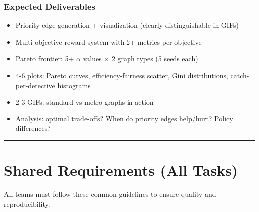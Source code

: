 \documentclass[11pt,a4paper]{scrartcl}
\newcommand{\sectiondivider}{%
  \vspace{0.2em}%
  \noindent\textcolor{rulecolor}{\rule{0.3\textwidth}{0.4pt}}%
  \vspace{0.3em}%
}
\begin{document}
\subsubsection*{Expected Deliverables}
\begin{itemize}[leftmargin=1.2em]
    \item Priority edge generation + visualization (clearly distinguishable in GIFs)
    \item Multi-objective reward system with 2+ metrics per objective
    \item Pareto frontier: 5+ $\alpha$ values $\times$ 2 graph types (5 seeds each)
    \item 4-6 plots: Pareto curves, efficiency-fairness scatter, Gini distributions, catch-per-detective histograms
    \item 2-3 GIFs: standard vs metro graphs in action
    \item Analysis: optimal trade-offs? When do priority edges help/hurt? Policy differences?
\end{itemize}

\sectiondivider

\section*{Shared Requirements (All Tasks)}

All teams must follow these common guidelines to ensure quality and reproducibility.
\end{document}
